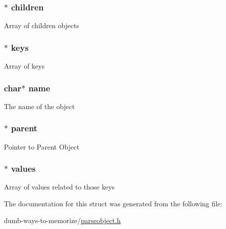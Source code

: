 \subsubsection[{\texorpdfstring{children}{children}}]{$\ast$ children}\hypertarget{structobject__s_a2746ae4a23a7e9cd4c7d266d32c3f30f}{}\label{structobject__s_a2746ae4a23a7e9cd4c7d266d32c3f30f}
Array of children objects 
\subsubsection[{\texorpdfstring{keys}{keys}}]{$\ast$ keys}\hypertarget{structobject__s_a720905251b014f5c9ec82e66e8463f4e}{}\label{structobject__s_a720905251b014f5c9ec82e66e8463f4e}
Array of keys 
\subsubsection[{\texorpdfstring{name}{name}}]{\setlength{\rightskip}{0pt plus 5cm}char$\ast$ name}\hypertarget{structobject__s_a5ac083a645d964373f022d03df4849c8}{}\label{structobject__s_a5ac083a645d964373f022d03df4849c8}
The name of the object 
\subsubsection[{\texorpdfstring{parent}{parent}}]{$\ast$ parent}\hypertarget{structobject__s_a444f5b5cbba653b103c8841fa8536b8d}{}\label{structobject__s_a444f5b5cbba653b103c8841fa8536b8d}
Pointer to Parent Object 
\subsubsection[{\texorpdfstring{values}{values}}]{$\ast$ values}\hypertarget{structobject__s_ab74cb2267ebadadd15e6bb59e85cc3f9}{}\label{structobject__s_ab74cb2267ebadadd15e6bb59e85cc3f9}
Array of values related to those keys 

The documentation for this struct was generated from the following file\+:\begin{DoxyCompactItemize}
\item 
dumb-\/ways-\/to-\/memorize/\hyperlink{parseobject_8h}{parseobject.\+h}\end{DoxyCompactItemize}
